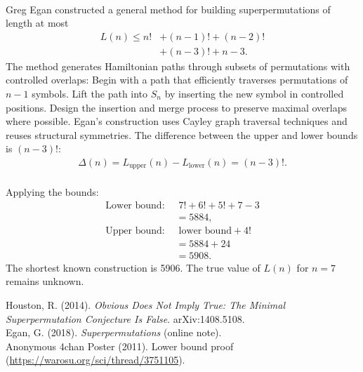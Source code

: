 \begin{technical}
\\
Greg Egan constructed a general method for building superpermutations of length at most
\begin{align*}
L(n) \leq n! &+ (n-1)! + (n-2)! \\  
&+ (n-3)! + n - 3.
\end{align*}
The method generates Hamiltonian paths through subsets of permutations with controlled overlaps: Begin with a path that efficiently traverses permutations of $n-1$ symbols. Lift the path into $S_n$ by inserting the new symbol in controlled positions. Design the insertion and merge process to preserve maximal overlaps where possible. Egan's construction uses Cayley graph traversal techniques and reuses structural symmetries. The difference between the upper and lower bounds is $(n-3)!$:
\begin{align*}
\Delta(n) = L_{\text{upper}}(n) - L_{\text{lower}}(n) = (n-3)!.
\end{align*}
\\
Applying the bounds:
\begin{align*}
\text{Lower bound: } &\; 7! + 6! + 5! + 7 - 3\\
 &= 5884, \\
\text{Upper bound: } &\; \text{lower bound} + 4!\\
 &= 5884 + 24\\
 &= 5908.
\end{align*}
The shortest known construction is 5906. The true value of $L(n)$ for $n = 7$ remains unknown.

\techref
{\footnotesize
Houston, R. (2014). \textit{Obvious Does Not Imply True: The Minimal Superpermutation Conjecture Is False}. arXiv:1408.5108.\\
Egan, G. (2018). \textit{Superpermutations} (online note).\\
Anonymous 4chan Poster (2011). Lower bound proof (\url{https://warosu.org/sci/thread/3751105}).
}
\end{technical}
